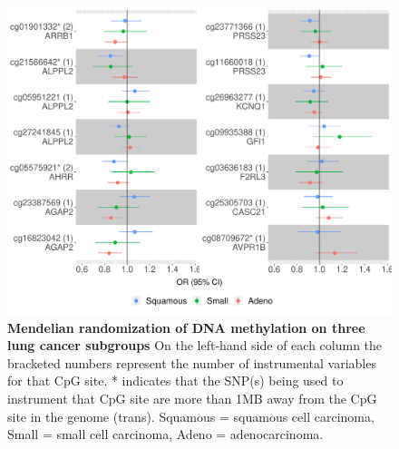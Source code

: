\documentclass[11pt,oneside]{bristolthesis}
\begin{document}
\begin{figure}

{\centering \includegraphics[width=1\linewidth]{figure/07-dnam_lungcancer_mr/sup_fig3-lc_subtype_mr} 

}

\caption[Mendelian randomization of DNA methylation on three lung cancer subgroups]{\textbf{Mendelian randomization of DNA methylation on three lung cancer subgroups} On the left-hand side of each column the bracketed numbers represent the number of instrumental variables for that CpG site. * indicates that the SNP(s) being used to instrument that CpG site are more than 1MB away from the CpG site in the genome (trans). Squamous = squamous cell carcinoma, Small = small cell carcinoma, Adeno = adenocarcinoma.}\label{fig:sup-fig3-07}
\end{figure}
\end{document}
